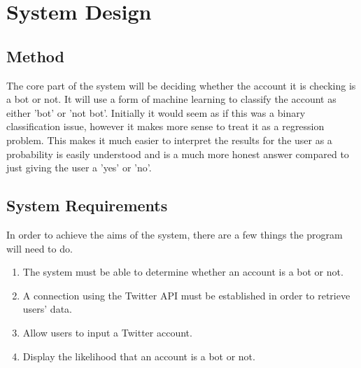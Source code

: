 
\chapter{System Design}

\label{Chapter3}

\section{Method}
The core part of the system will be deciding whether the account it is checking is a bot or not. It will use a form of machine learning to classify the account as either 'bot' or 'not bot'. Initially it would seem as if this was a binary classification issue, however it makes more sense to treat it as a regression problem. This makes it much easier to interpret the results for the user as a probability is easily understood and is a much more honest answer compared to just giving the user a 'yes' or 'no'.


\section{System Requirements}
In order to achieve the aims of the system, there are a few things the program will need to do.
\begin{enumerate}
	\item The system must be able to determine whether an account is a bot or not.
	\item A connection using the Twitter API must be established in order to retrieve users' data.
	\item Allow users to input a Twitter account.
	\item Display the likelihood that an account is a bot or not.
\end{enumerate}



